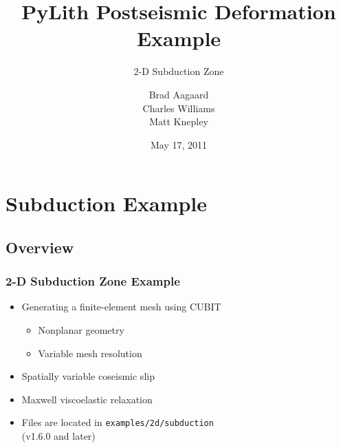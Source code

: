 \documentclass{beamer}
\title{PyLith Postseismic Deformation Example}
\subtitle{2-D Subduction Zone}
\author{Brad Aagaard \\
  Charles Williams \\
  Matt Knepley}
\institute{}
\date{May 17, 2011}
\begin{document}
\maketitle


\section{Subduction Example}
\subsection{Overview}

\begin{frame}
  \frametitle{2-D Subduction Zone Example}

  \begin{itemize}
  \item Generating a finite-element mesh using CUBIT
    \begin{itemize}
    \item Nonplanar geometry
    \item Variable mesh resolution
    \end{itemize}
  \item Spatially variable coseismic slip
  \item Maxwell viscoelastic relaxation
  \item Files are located in {\tt examples/2d/subduction}\\
    (v1.6.0 and later)
  \end{itemize}
  
\end{frame}
\end{document}
